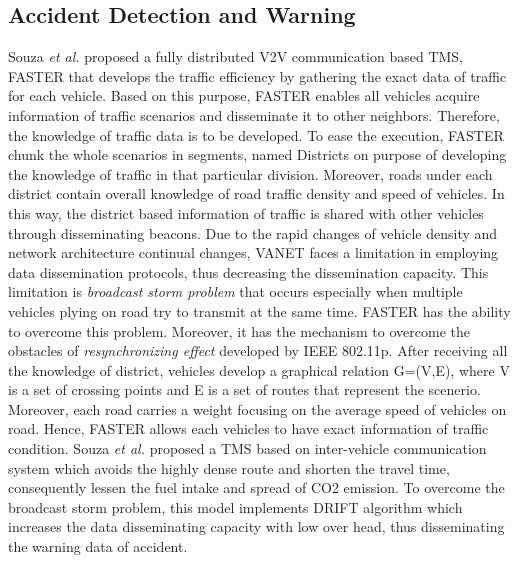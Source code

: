 \documentclass[conference]{IEEEtran}
\begin{document}
\subsection{Accident Detection and Warning}
Souza \textit{et al.} \cite{de2016fully} proposed a fully distributed V2V communication based TMS, FASTER that develops the traffic efficiency by gathering the exact data of traffic for each vehicle. Based on this purpose, FASTER enables all vehicles acquire information of traffic scenarios and disseminate it to other neighbors. Therefore, the knowledge of traffic data is to be developed. To ease the execution, FASTER chunk  the whole scenarios in segments, named Districts on purpose of developing the knowledge of traffic in that particular division.  Moreover, roads under each district contain overall knowledge of road traffic density and speed of vehicles.  In this way, the district based information of traffic is shared with other vehicles through disseminating beacons. Due to the rapid changes of vehicle density and network architecture continual changes, VANET faces a limitation in employing data dissemination protocols, thus decreasing the dissemination capacity. This limitation is \textit{broadcast storm problem} \cite{souza2014add} that occurs especially when multiple vehicles plying on road try to transmit at the same time. FASTER has the ability to overcome this problem. Moreover, it has the mechanism to overcome the obstacles of \textit{resynchronizing effect} \cite{souza2014add} developed by IEEE 802.11p. After receiving all the knowledge of district, vehicles develop a graphical relation G=(V,E), where V is a set of crossing points and E is a set of routes that represent the scenerio. Moreover, each road carries a weight focusing on the average speed of vehicles on road. Hence, FASTER allows each vehicles to have exact information of traffic condition.
Souza \textit{et al.} \cite{Souza:2014:DGE:2642668.2642677} proposed a TMS based on inter-vehicle communication system which avoids the highly dense route and shorten the travel time, consequently lessen the fuel intake and spread of CO2 emission. To overcome the broadcast storm problem, this model implements DRIFT algorithm which increases the data disseminating capacity with low over head, thus disseminating the warning data of accident.
\end{document}
